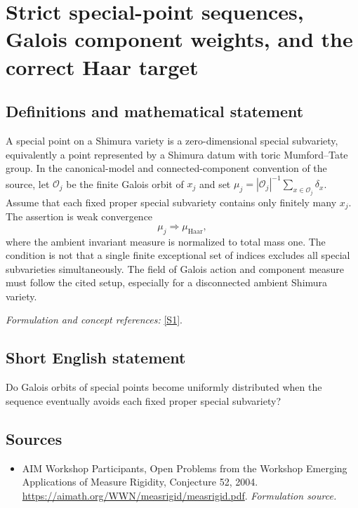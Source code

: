 \documentclass[11pt]{article}
\begin{document}
\section*{\texorpdfstring{Strict special-point sequences, Galois component weights, and the correct Haar target}{Strict special-point sequences, Galois component weights, and the correct Haar target}}\label{statement}
\subsection{Definitions and mathematical statement}
A special point on a Shimura variety is a zero-dimensional special subvariety, equivalently a point represented by a Shimura datum with toric Mumford--Tate group. In the canonical-model and connected-component convention of the source, let $\mathcal O_j$ be the finite Galois orbit of $x_j$ and set
$\mu_j=|\mathcal O_j|^{-1}\sum_{x\in\mathcal O_j}\delta_x$. Assume that each fixed proper special subvariety contains only finitely many $x_j$. The assertion is weak convergence
\[
 \mu_j\Longrightarrow\mu_{\mathrm{Haar}},
\]
where the ambient invariant measure is normalized to total mass one. The condition is not that a single finite exceptional set of indices excludes all special subvarieties simultaneously. The field of Galois action and component measure must follow the cited setup, especially for a disconnected ambient Shimura variety.
\par\smallskip\textit{Formulation and concept references:} \href{https://aimath.org/WWN/measrigid/measrigid.pdf}{[S1]}.

\subsection{Short English statement}
Do Galois orbits of special points become uniformly distributed when the sequence eventually avoids each fixed proper special subvariety?
\subsection{Sources}
\begin{itemize}
\item[S1]AIM Workshop Participants, Open Problems from the Workshop Emerging Applications of Measure Rigidity, Conjecture 52, 2004.
\url{https://aimath.org/WWN/measrigid/measrigid.pdf}.
\textit{Formulation source.}
\end{itemize}
\end{document}
